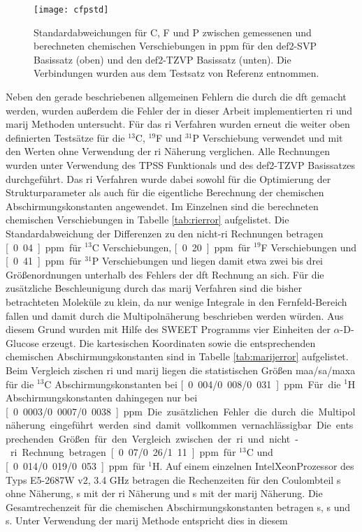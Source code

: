 \begin{figure}[ht!]
	\centering
	\texttt{[image: cfpstd]}
	\captionsetup{figurewithin = chapter}
	\captionsetup{font=small, labelfont=bf}\caption[Standardabweichungen für unterschiedliche Funktionale und Basissätze]{Standardabweichungen für C, F und P zwischen gemessenen und berechneten chemischen Verschiebungen in ppm für den def2-SVP Basissatz (oben) und den def2-TZVP Basissatz (unten). Die Verbindungen wurden aus dem Testsatz von Referenz \cite{gauss1993effects} entnommen.} 
\label{abb:cfpshifts}
\end{figure}

\FloatBarrier
Neben den gerade beschriebenen allgemeinen Fehlern die durch die \ac{dft} gemacht werden, wurden außerdem die Fehler der in dieser Arbeit implementierten \ac{ri} und \ac{marij} Methoden untersucht. Für das \ac{ri} Verfahren wurden erneut die weiter oben definierten Testsätze für die $^{13}$C, $^{19}$F und $^{31}$P Verschiebung verwendet und mit den Werten ohne Verwendung der \ac{ri} Näherung verglichen. Alle Rechnungen wurden unter Verwendung des TPSS Funktionals und des def2-TZVP Basissatzes durchgeführt. Das \ac{ri} Verfahren wurde dabei sowohl für die Optimierung der Strukturparameter als auch für die eigentliche Berechnung der chemischen Abschirmungskonstanten angewendet. Im Einzelnen sind die berechneten chemischen Verschiebungen in Tabelle \ref{tab:rierror} aufgelistet. Die Standardabweichung der Differenzen zu den nicht-\ac{ri} Rechnungen betragen \unit[0.04]{ppm} für $^{13}$C Verschiebungen, \unit[0.20]{ppm} für $^{19}$F Verschiebungen und \unit[0.41]{ppm} für $^{31}$P Verschiebungen und liegen damit etwa zwei bis drei Größenordnungen unterhalb des Fehlers der \ac{dft} Rechnung an sich. Für die zusätzliche Beschleunigung durch das \ac{marij} Verfahren sind die bisher betrachteten Moleküle zu klein, da nur wenige Integrale in den Fernfeld-Bereich fallen und damit durch die Multipolnäherung beschrieben werden würden. Aus diesem Grund wurden mit Hilfe des SWEET\supercite{bohne1999sweet} Programms vier Einheiten der $\alpha$-D-Glucose erzeugt. Die kartesischen Koordinaten sowie die entsprechenden chemischen Abschirmungskonstanten sind in Tabelle \ref{tab:marijerror} aufgelistet. Beim Vergleich zischen \ac{ri} und \ac{marij} liegen die statistischen Größen \ac{maa}/\ac{sa}/\ac{maxa} für die $^{13}$C Abschirmungskonstanten bei \unit[0.004/0.008/0.031]{ppm}. Für die $^{1}$H Abschirmungskonstanten dahingegen nur bei \unit[0.0003/0.0007/0.0038]{ppm}. Die zusätzlichen Fehler die durch die Multipolnäherung eingeführt werden sind damit vollkommen vernachlässigbar. Die entsprechenden Größen für den Vergleich zwischen der \ac{ri} und nicht-\ac{ri} Rechnung betragen \unit[0.07/0.26/1.11]{ppm} für $^{13}$C und \unit[0.014/0.019/0.053]{ppm} für $^{1}$H. Auf einem einzelnen Intel\textregistered Xeon\textregistered Prozessor des Typs E5-2687W v2, 3.4 GHz betragen die Rechenzeiten für den Coulombteil \unit[4099]{s} ohne Näherung, \unit[220]{s} mit der \ac{ri} Näherung und \unit[117]{s} mit der \ac{marij} Näherung. Die Gesamtrechenzeit für die chemischen Abschirmungskonstanten betragen \unit[4610]{s}, \unit[741]{s} und \unit[633]{s}. Unter Verwendung der \ac{marij} Methode entspricht dies in diesem 